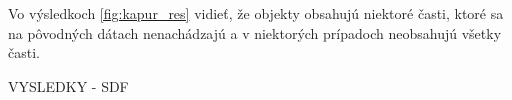 \documentclass[a4paper,11pt,oneside]{article}%
\begin{document}
Vo výsledkoch \ref{fig:kapur_res} vidieť, že objekty obsahujú niektoré časti, ktoré sa na pôvodných dátach nenachádzajú a v niektorých prípadoch neobsahujú všetky časti. 

VYSLEDKY - SDF

\begin{figure}[H]  
    \hspace{5px}

\end{figure}
\end{document}
